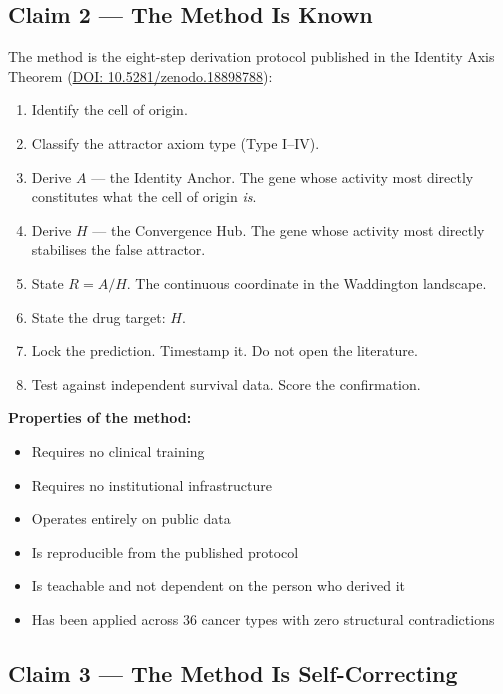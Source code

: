 \documentclass[11pt, a4paper]{article}
\begin{document}
\subsection{Claim 2 --- The Method Is Known}

The method is the eight-step derivation protocol published
in the Identity Axis Theorem
(\href{https://doi.org/10.5281/zenodo.18898788}
{DOI: 10.5281/zenodo.18898788}):

\begin{enumerate}
    \item Identify the cell of origin.
    \item Classify the attractor axiom type (Type I--IV).
    \item Derive $A$ --- the Identity Anchor. The gene
    whose activity most directly constitutes what the cell
    of origin \emph{is}.
    \item Derive $H$ --- the Convergence Hub. The gene
    whose activity most directly stabilises the false
    attractor.
    \item State $R = A/H$. The continuous coordinate in
    the Waddington landscape.
    \item State the drug target: $H$.
    \item Lock the prediction. Timestamp it. Do not open
    the literature.
    \item Test against independent survival data. Score
    the confirmation.
\end{enumerate}

\begin{mdframed}[backgroundcolor=methodbox,
                 linecolor=green!40!black,
                 linewidth=1pt]
\textbf{Properties of the method:}
\begin{itemize}[noitemsep]
    \item Requires no clinical training
    \item Requires no institutional infrastructure
    \item Operates entirely on public data
    \item Is reproducible from the published protocol
    \item Is teachable and not dependent on the person
    who derived it
    \item Has been applied across 36 cancer types with
    zero structural contradictions
\end{itemize}
\end{mdframed}

\subsection{Claim 3 --- The Method Is Self-Correcting}
\end{document}
